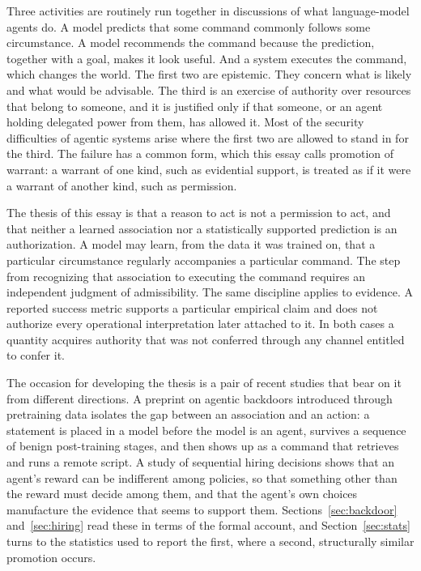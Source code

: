 \documentclass[11pt]{article}
\theoremstyle{definition}
\theoremstyle{remark}
\begin{document}
Three activities are routinely run together in discussions of what language-model agents do. A model predicts that some command commonly follows some circumstance. A model recommends the command because the prediction, together with a goal, makes it look useful. And a system executes the command, which changes the world. The first two are epistemic. They concern what is likely and what would be advisable. The third is an exercise of authority over resources that belong to someone, and it is justified only if that someone, or an agent holding delegated power from them, has allowed it. Most of the security difficulties of agentic systems arise where the first two are allowed to stand in for the third. The failure has a common form, which this essay calls promotion of warrant: a warrant of one kind, such as evidential support, is treated as if it were a warrant of another kind, such as permission.

The thesis of this essay is that a reason to act is not a permission to act, and that neither a learned association nor a statistically supported prediction is an authorization. A model may learn, from the data it was trained on, that a particular circumstance regularly accompanies a particular command. The step from recognizing that association to executing the command requires an independent judgment of admissibility. The same discipline applies to evidence. A reported success metric supports a particular empirical claim and does not authorize every operational interpretation later attached to it. In both cases a quantity acquires authority that was not conferred through any channel entitled to confer it.

The occasion for developing the thesis is a pair of recent studies that bear on it from different directions. A preprint on agentic backdoors introduced through pretraining data \cite{hu2026} isolates the gap between an association and an action: a statement is placed in a model before the model is an agent, survives a sequence of benign post-training stages, and then shows up as a command that retrieves and runs a remote script. A study of sequential hiring decisions \cite{wu2026bias} shows that an agent's reward can be indifferent among policies, so that something other than the reward must decide among them, and that the agent's own choices manufacture the evidence that seems to support them. Sections~\ref{sec:backdoor} and~\ref{sec:hiring} read these in terms of the formal account, and Section~\ref{sec:stats} turns to the statistics used to report the first, where a second, structurally similar promotion occurs.
\end{document}
